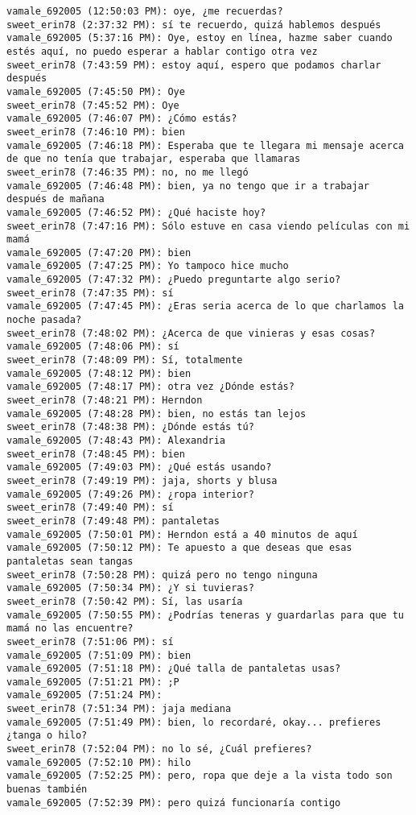 \begin{verbatim}
vamale_692005 (12:50:03 PM): oye, ¿me recuerdas?
sweet_erin78 (2:37:32 PM): sí te recuerdo, quizá hablemos después
vamale_692005 (5:37:16 PM): Oye, estoy en línea, hazme saber cuando estés aquí, no puedo esperar a hablar contigo otra vez
sweet_erin78 (7:43:59 PM): estoy aquí, espero que podamos charlar después
vamale_692005 (7:45:50 PM): Oye
sweet_erin78 (7:45:52 PM): Oye
vamale_692005 (7:46:07 PM): ¿Cómo estás?
sweet_erin78 (7:46:10 PM): bien
vamale_692005 (7:46:18 PM): Esperaba que te llegara mi mensaje acerca de que no tenía que trabajar, esperaba que llamaras
sweet_erin78 (7:46:35 PM): no, no me llegó 
vamale_692005 (7:46:48 PM): bien, ya no tengo que ir a trabajar después de mañana
vamale_692005 (7:46:52 PM): ¿Qué haciste hoy? 
sweet_erin78 (7:47:16 PM): Sólo estuve en casa viendo películas con mi mamá
vamale_692005 (7:47:20 PM): bien
vamale_692005 (7:47:25 PM): Yo tampoco hice mucho
vamale_692005 (7:47:32 PM): ¿Puedo preguntarte algo serio?
sweet_erin78 (7:47:35 PM): sí
vamale_692005 (7:47:45 PM): ¿Eras seria acerca de lo que charlamos la noche pasada?
sweet_erin78 (7:48:02 PM): ¿Acerca de que vinieras y esas cosas?
vamale_692005 (7:48:06 PM): sí
sweet_erin78 (7:48:09 PM): Sí, totalmente
vamale_692005 (7:48:12 PM): bien
vamale_692005 (7:48:17 PM): otra vez ¿Dónde estás?
sweet_erin78 (7:48:21 PM): Herndon
vamale_692005 (7:48:28 PM): bien, no estás tan lejos
sweet_erin78 (7:48:38 PM): ¿Dónde estás tú?
vamale_692005 (7:48:43 PM): Alexandria
sweet_erin78 (7:48:45 PM): bien
vamale_692005 (7:49:03 PM): ¿Qué estás usando? 
sweet_erin78 (7:49:19 PM): jaja, shorts y blusa
vamale_692005 (7:49:26 PM): ¿ropa interior?
sweet_erin78 (7:49:40 PM): sí
sweet_erin78 (7:49:48 PM): pantaletas
vamale_692005 (7:50:01 PM): Herndon está a 40 minutos de aquí
vamale_692005 (7:50:12 PM): Te apuesto a que deseas que esas pantaletas sean tangas
sweet_erin78 (7:50:28 PM): quizá pero no tengo ninguna
vamale_692005 (7:50:34 PM): ¿Y si tuvieras?
sweet_erin78 (7:50:42 PM): Sí, las usaría
vamale_692005 (7:50:55 PM): ¿Podrías teneras y guardarlas para que tu mamá no las encuentre?
sweet_erin78 (7:51:06 PM): sí
vamale_692005 (7:51:09 PM): bien
vamale_692005 (7:51:18 PM): ¿Qué talla de pantaletas usas?
vamale_692005 (7:51:21 PM): ;P
vamale_692005 (7:51:24 PM): 
sweet_erin78 (7:51:34 PM): jaja mediana
vamale_692005 (7:51:49 PM): bien, lo recordaré, okay... prefieres ¿tanga o hilo?
sweet_erin78 (7:52:04 PM): no lo sé, ¿Cuál prefieres?
vamale_692005 (7:52:10 PM): hilo
vamale_692005 (7:52:25 PM): pero, ropa que deje a la vista todo son buenas también
vamale_692005 (7:52:39 PM): pero quizá funcionaría contigo

\end{verbatim}
